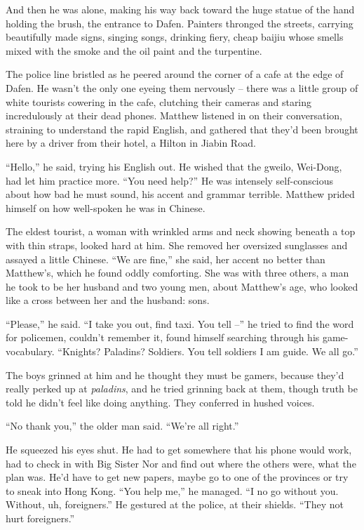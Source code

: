 And then he was alone, making his way back toward the huge statue
of the hand holding the brush, the entrance to Dafen. Painters
thronged the streets, carrying beautifully made signs, singing
songs, drinking fiery, cheap baijiu whose smells mixed with the
smoke and the oil paint and the turpentine.

The police line bristled as he peered around the corner of a cafe
at the edge of Dafen. He wasn't the only one eyeing them nervously
-- there was a little group of white tourists cowering in the cafe,
clutching their cameras and staring incredulously at their dead
phones. Matthew listened in on their conversation, straining to
understand the rapid English, and gathered that they'd been brought
here by a driver from their hotel, a Hilton in Jiabin Road.

``Hello,'' he said, trying his English out. He wished that the
gweilo, Wei-Dong, had let him practice more. ``You need help?'' He
was intensely self-conscious about how bad he must sound, his
accent and grammar terrible. Matthew prided himself on how
well-spoken he was in Chinese.

The eldest tourist, a woman with wrinkled arms and neck showing
beneath a top with thin straps, looked hard at him. She removed her
oversized sunglasses and assayed a little Chinese. ``We are fine,''
she said, her accent no better than Matthew's, which he found oddly
comforting. She was with three others, a man he took to be her
husband and two young men, about Matthew's age, who looked like a
cross between her and the husband: sons.

``Please,'' he said. ``I take you out, find taxi. You tell --'' he
tried to find the word for policemen, couldn't remember it, found
himself searching through his game-vocabulary. ``Knights? Paladins?
Soldiers. You tell soldiers I am guide. We all go.''

The boys grinned at him and he thought they must be gamers, because
they'd really perked up at \emph{paladins}, and he tried grinning
back at them, though truth be told he didn't feel like doing
anything. They conferred in hushed voices.

``No thank you,'' the older man said. ``We're all right.''

He squeezed his eyes shut. He had to get somewhere that his phone
would work, had to check in with Big Sister Nor and find out where
the others were, what the plan was. He'd have to get new papers,
maybe go to one of the provinces or try to sneak into Hong Kong.
``You help me,'' he managed. ``I no go without you. Without, uh,
foreigners.'' He gestured at the police, at their shields. ``They not
hurt foreigners.''

